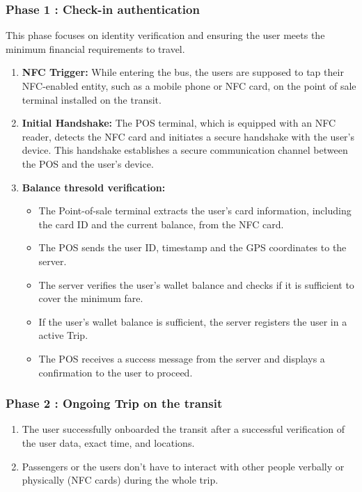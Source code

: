 \documentclass[sigconf, nonacm]{acmart}
\begin{document}
\subsubsection{Phase 1 : Check-in authentication}

This phase focuses on identity verification and ensuring the user meets the minimum financial requirements to travel.

\begin{enumerate}
    \item \textbf{NFC Trigger:} While entering the bus, the users are supposed to tap their NFC-enabled entity, such as a mobile phone or NFC card, on the point of sale terminal installed on the transit.
    \item \textbf{Initial Handshake:} The POS terminal, which is equipped with an NFC reader, detects the NFC card and initiates a secure handshake with the user's device. This handshake establishes a secure communication channel between the POS and the user's device.
    \item \textbf{Balance thresold verification:} 
     \begin{itemize}
      \item The Point-of-sale terminal extracts the user's card information, including the card ID and the current balance, from the NFC card.
      \item The POS sends the user ID, timestamp and the GPS coordinates to the server.
      \item The server verifies the user's wallet balance and checks if it is sufficient to cover the minimum fare.
      \item If the user's wallet balance is sufficient, the server registers the user in a active Trip.
      \item The POS receives a success message from the server and displays a confirmation to the user to proceed.
     \end{itemize}
\end{enumerate}

\subsubsection{Phase 2 : Ongoing Trip on the transit}

\begin{enumerate}
  \item The user successfully onboarded the transit after a successful verification of the user data, exact time, and locations.
  \item Passengers or the users don't have to interact with other people verbally or physically (NFC cards) during the whole trip. 
\end{enumerate}
\end{document}
